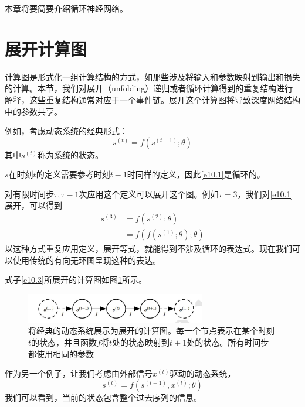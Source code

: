 \documentclass{ctexart}
\begin{document}
    本章将要简要介绍循环神经网络。

    \section{展开计算图}
        计算图是形式化一组计算结构的方式，如那些涉及将输入和参数映射到输出和损失的计算。本节，我们对展开（unfolding）递归或者循环计算得到的重复结构进行解释，这些重复结构通常对应于一个事件链。展开这个计算图将导致深度网络结构中的参数共享。

        例如，考虑动态系统的经典形式：
        \begin{equation}
            s^{(t)} = f(s^{(t-1)};\theta)
            \label{e10.1}
        \end{equation}
        其中$s^{(t)}$称为系统的状态。

        $s$在时刻$t$的定义需要参考时刻$t-1$时同样的定义，因此\ref{e10.1}是循环的。

        对有限时间步$\tau,\tau-1$次应用这个定义可以展开这个图。例如$\tau=3$，我们对\ref{e10.1}展开，可以得到
        \begin{equation}
            \begin{split}
                s^{(3)} &= f(s^{(2)};\theta) \\
                        &= f(f(s^{(1)};\theta);\theta)
            \end{split}
            \label{e10.3}
        \end{equation}
        以这种方式重复应用定义，展开等式，就能得到不涉及循环的表达式。现在我们可以使用传统的有向无环图呈现这种的表达。

        式子\ref{e10.3}所展开的计算图如图\ref{f10.1}所示。
        \begin{figure}[hb]
            \centering
            \includegraphics[width=0.7\textwidth]{f1}
            \caption{将经典的动态系统展示为展开的计算图。每一个节点表示在某个时刻$t$的状态，并且函数$f$将$t$处的状态映射到$t+1$处的状态。所有时间步都使用相同的参数}
            \label{f10.1}
        \end{figure}
        作为另一个例子，让我们考虑由外部信号$x^{(t)}$驱动的动态系统，
        \begin{equation}
            s^{(t)} = f(s^{(t-1)},x^{(t)};\theta)
            \label{e10.4}
        \end{equation}
        我们可以看到，当前的状态包含整个过去序列的信息。
\end{document}

